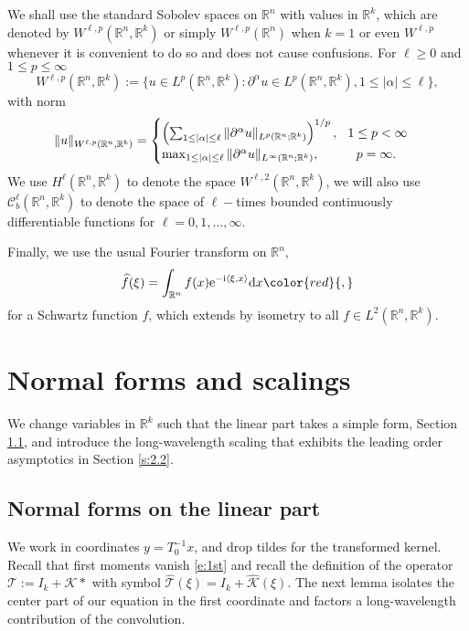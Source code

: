 \documentclass[10pt]{article}
\newcommand{\R}{\mathbb{R}}
\newcommand{\rmd}{\mathrm{d}}
\newcommand{\rme}{\mathrm{e}}
\newcommand{\rmi}{\mathrm{i}}
\newcommand{\K}{\mathcal{K}}
\newcommand{\That}{\widehat{\mathcal{T}}}
\begin{document}
We shall use the standard Sobolev spaces on $\R^n$ with values in $\R^k$, which are denoted by $W^{\ell,p}(\R^n, \R^k)$ or simply $W^{\ell,p}(\R^n)$ when $k=1$ or even $W^{\ell,p}$ whenever it is convenient to do so and does not cause confusions. For $\ell \ge 0$ and $1\le p \le \infty$
\[
W^{\ell,p}(\R^n,\R^k) := \{ u \in L^p(\R^n,\R^k): \partial^\alpha u \in L^p(\R^n,\R^k), 1\le |\alpha| \le \ell \},
\]
with norm
\[
\|u\|_{W^{\ell,p}(\R^n,\R^k)}=
\begin{cases}
\left(\sum_{1\le |\alpha| \le \ell} \|\partial^\alpha u \|_{L^p(\R^n;\R^k)}\right)^{1/p}, \hspace{0.1in}1\le p<\infty \\
\max_{1\le |\alpha| \le \ell}\|\partial^\alpha u\|_{L^\infty(\R^n;\R^k)}, \hspace{0.4in} p=\infty.
\end{cases}
\]
We use $H^\ell(\R^n,\R^k)$ to denote the space $W^{\ell,2}(\R^n,\R^k)$, we will also use $\mathscr{C}_b^\ell(\R^n,\R^k)$ to denote the space of $\ell-$times bounded continuously differentiable functions for $\ell=0,1,\ldots,\infty$.
 
Finally, we use the usual Fourier transform on $\R^n$, 
\[
\widehat{f} (\xi)= \int_{\R^n} f(x)\rme^{-\rmi \langle \xi,x\rangle}\rmd x \color{red}{,}
\]
 for a Schwartz function $f$, which extends by isometry to all $f \in L^2(\R^n,\R^k)$. 


\section{Normal forms and scalings}\label{s:2}
We change variables in $\R^k$ such that the linear part takes a simple form, Section \ref{s:2.1}, and introduce the long-wavelength scaling that exhibits the leading order asymptotics in Section \ref{s:2.2}.

\subsection{Normal forms on the linear part}\label{s:2.1}
We work in coordinates $y=T_0^{-1}x$, and drop tildes for the transformed kernel. Recall that first moments vanish \eqref{e:1st} and recall the definition of the operator $\mathcal{T}:=I_k+\K*$ with symbol $\That (\xi) = I_k + \widehat{{\K}} (\xi)$.  The next lemma isolates the center part of our equation in the first coordinate and factors a long-wavelength contribution of the convolution. 
\end{document}
